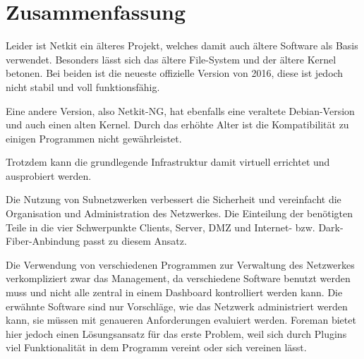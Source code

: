 \chapter{Zusammenfassung}
Leider ist Netkit ein älteres Projekt, welches damit auch ältere Software als Basis verwendet. Besonders lässt sich das ältere File-System und der ältere Kernel betonen. Bei beiden ist die neueste offizielle Version von 2016, diese ist jedoch nicht stabil und voll funktionsfähig.

Eine andere Version, also Netkit-NG, hat ebenfalls eine veraltete Debian-Version und auch einen alten Kernel. Durch das erhöhte Alter ist die Kompatibilität zu einigen Programmen nicht gewährleistet.

Trotzdem kann die grundlegende Infrastruktur damit virtuell errichtet und ausprobiert werden.

Die Nutzung von Subnetzwerken verbessert die Sicherheit und vereinfacht die Organisation und Administration des Netzwerkes. Die Einteilung der benötigten Teile in die vier Schwerpunkte Clients, Server, DMZ und Internet- bzw. Dark-Fiber-Anbindung passt zu diesem Ansatz.

Die Verwendung von verschiedenen Programmen zur Verwaltung des Netzwerkes verkompliziert zwar das Management, da verschiedene Software benutzt werden muss und nicht alle zentral in einem Dashboard kontrolliert werden kann. Die erwähnte Software sind nur Vorschläge, wie das Netzwerk administriert werden kann, sie müssen mit genaueren Anforderungen evaluiert werden. Foreman bietet hier jedoch einen Lösungsansatz für das erste Problem, weil sich durch Plugins viel Funktionalität in dem Programm vereint oder sich vereinen lässt.

